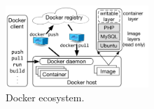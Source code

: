 \begin{figure}
	\centering
	\includegraphics[width=0.48\textwidth]{graphs/fig-docker-architecture-v2}
	\caption{Docker ecosystem. 
	}
	\label{fig-docker-architecture}
\end{figure}
